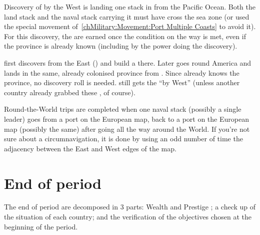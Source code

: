 \bparag Discovery of \granderegionPanama by the West is landing one
stack in \granderegionPanama from the Pacific Ocean. Both the land
stack and the naval stack carrying it must have cross the \seazoneHorn
sea zone (or used the special movement
of~\ref{chMilitary:Movement:Port Multiple Coasts} to avoid it).
\bparag For this discovery, the \VPs are earned once the condition on
the way is met, even if the province is already known (including by the
power doing the discovery).

\begin{exemple}
  \HIS first discovers \granderegionPanama from the East
  (\seazoneMexique) and build a \COL there. Later \HIS goes round
  America and lands in the same, already colonised province from
  \seazonePanama. Since \HIS already knows the province, no discovery
  roll is needed. \HIS still gets the ``\granderegionPanama by West''
  \VPs (unless another country already grabbed these \VPs, of course).
\end{exemple}


\aparag[Circumnavigation] Round-the-World trips are completed when one
naval stack (possibly a single leader) goes from a port on the European
map, back to a port on the European map (possibly the same) after
going all the way around the World.
\bparag If you're not sure about a circumnavigation, it is done by
using an odd number of time the adjacency between the East and West
edges of the \ROTW map.


\section{End of period \VPs}
\aparag The end of period \VPs are decomposed in 3 parts: Wealth and Prestige
\VPs; a check up of the situation of each country; and the verification of the
objectives chosen at the beginning of the period.


